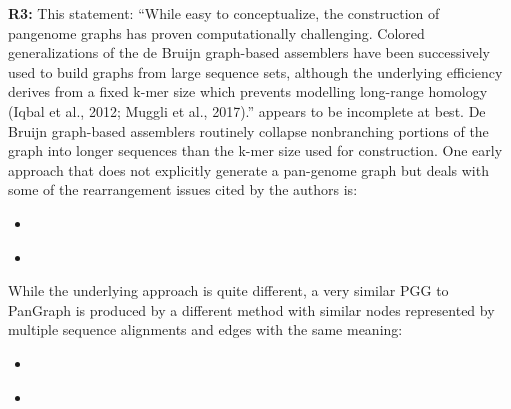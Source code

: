 \documentclass[aps,rmp,onecolumn]{revtex4-1}
\newcommand{\Marco}[1]{{\color{gray}Marco: #1}}
\newcommand{\reviewer}[2]{\textbf{#1:} #2\vskip 5mm}
\begin{document}
\reviewer{R3}{This statement: ``While easy to conceptualize, the construction of pangenome graphs has proven computationally challenging. Colored generalizations of the de Bruijn graph-based assemblers have been successively used to build graphs from large sequence sets, although the underlying efficiency derives from a fixed k-mer size which prevents modelling long-range homology (Iqbal et al., 2012; Muggli et al., 2017).'' appears to be incomplete at best. De Bruijn graph-based assemblers routinely collapse nonbranching portions of the graph into longer sequences than the k-mer size used for construction.
      One early approach that does not explicitly generate a pan-genome graph but deals with some of the rearrangement issues cited by the authors is:
      \begin{itemize}
            \item \cite{angiuoli2011improving}
            \item \cite{angiuoli2011mugsy}
      \end{itemize}
      While the underlying approach is quite different, a very similar PGG to PanGraph is produced by a different method with similar nodes represented by multiple sequence alignments and edges with the same meaning:
      \begin{itemize}
            \item \cite{sutton2021pan}
            \item \cite{chan2015novel}
      \end{itemize}}
\end{document}
